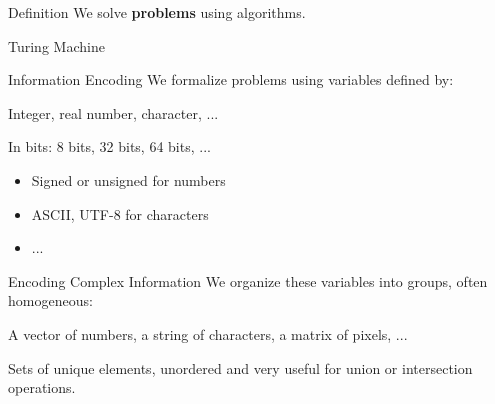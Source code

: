 \begin{frame}{Definition}
    We solve \textbf{problems} using algorithms.
\end{frame}

\begin{frame}{Turing Machine}
\end{frame}

\begin{frame}{Information Encoding}
    We formalize problems using variables defined by:
    \begin{description}[<+->]
        \item [TYPE] Integer, real number, character, ...
        \item [SIZE] In bits: 8 bits, 32 bits, 64 bits, ...
        \item [ENCODING] 
        \begin{itemize}
            \item Signed or unsigned for numbers
            \item ASCII, UTF-8 for characters
            \item ...
        \end{itemize}
    \end{description}
\end{frame}

\begin{frame}{Encoding Complex Information}
    We organize these variables into groups, often homogeneous:
    \begin{description}[<+->]
        \item [LISTS] A vector of numbers, a string of characters, a matrix of pixels, ...
        \item [COLLECTIONS] Sets of unique elements, unordered and very useful for union or intersection operations.
        \item [ETC ...]
    \end{description}
\end{frame}